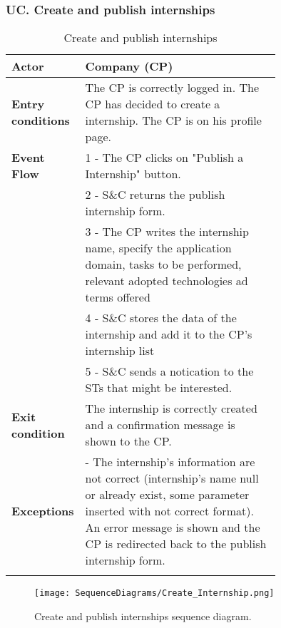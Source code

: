 \subsubsection*{UC\cuc . Create and publish internships}
\begin{center}
    \begin{longtable}{|l|p{0.75\linewidth}|}
        \hline
        \textbf{Actor}            & Company (CP)\\
        \hline
        \textbf{Entry conditions} & The CP is correctly logged in. The CP has decided to create a internship. The CP is on his profile page. \\
        \hline
        \textbf{Event Flow}     & 1 - The CP clicks on "Publish a Internship"                                button.\\
                                & 2 - S\&C returns the publish internship form.\\
                                & 3 - The CP writes the internship name, specify the application domain, tasks to be performed, relevant adopted technologies ad terms offered\\
                                & 4 - S\&C stores the data of the internship and add it to the CP's internship list\\
                                & 5 - S\&C sends a notication to the STs that might be interested.\\
        \hline
        \textbf{Exit condition}   & The internship is correctly created and a confirmation message is shown to the CP. \\       
        \hline
        \textbf{Exceptions}       & - The internship's information are not                                  correct (internship's name null or already                                exist, some parameter inserted with not correct                           format). An error message is shown and the CP                             is redirected back to the publish internship                              form.\\
        \hline
        \caption{Create and publish internships}
        \label{tab: create_and_publish_internships_usecase}
    \end{longtable}
\end{center}

\begin{figure}[H]
    \begin{center}
        \texttt{[image: SequenceDiagrams/Create\_Internship.png]}
        \caption{Create and publish internships sequence diagram.}
        \label{fig:create_internship_seqd}%
    \end{center}
\end{figure}

